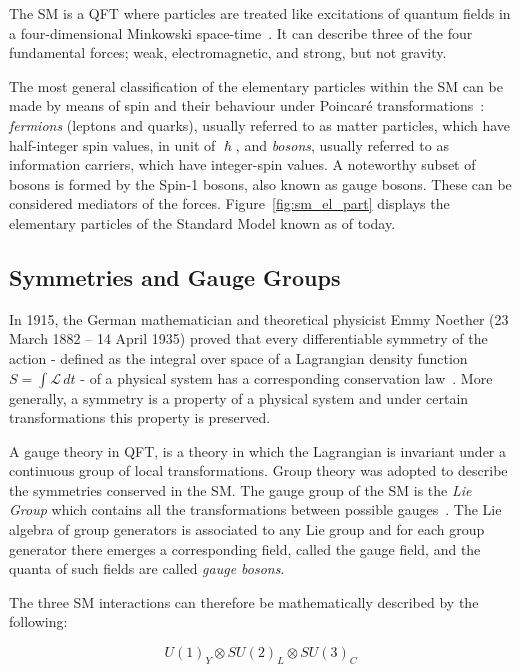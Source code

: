 		The \ac{SM} is a \ac{QFT} where particles are treated like excitations of quantum fields in a four-dimensional Minkowski space-time~\cite{Peskin1995}. It can describe three of the four fundamental forces; weak, electromagnetic, and strong, but not gravity.

		The most general classification of the elementary particles within the \ac{SM} can be made by means of spin and their behaviour under Poincaré transformations~\cite{Cottingham1998}: \textit{fermions} (leptons and quarks), usually referred to as matter particles, which have half-integer spin values, in unit of $\hslash$, and \textit{bosons}, usually referred to as information carriers, which have integer-spin values. A noteworthy subset of bosons is formed by the Spin-1 bosons, also known as gauge bosons. These can be considered mediators of the forces. Figure~\ref{fig:sm_el_part} displays the elementary particles of the Standard Model known as of today.



		\subsection*{Symmetries and Gauge Groups}

			In 1915, the German mathematician and theoretical physicist Emmy Noether (23 March 1882 – 14 April 1935) proved that every differentiable symmetry of the action - defined as the integral over space of a Lagrangian density function $S = \int \mathcal{L}\, dt$ - of a physical system has a corresponding conservation law~\cite{lederman2004symmetry}. More generally, a symmetry is a property of a physical system and under certain transformations this property is preserved. 

			A gauge theory in \ac{QFT}, is a theory in which the Lagrangian is invariant under a continuous group of local transformations. Group theory was adopted to describe the symmetries conserved in the \ac{SM}. The gauge group of the \ac{SM} is the \emph{Lie Group} which contains all the transformations between possible gauges~\cite{Cottingham1998}. The Lie algebra of group generators is associated to any Lie group and for each group generator there emerges a corresponding field, called the gauge field, and the quanta of such fields are called \emph{gauge bosons}.
			
			The three \ac{SM} interactions can therefore be mathematically described by the following:

			\begin{equation}
			\label{eq:SM_gaugeSym}
				U(1)_Y \otimes SU(2)_L \otimes SU(3)_C
			\end{equation}

